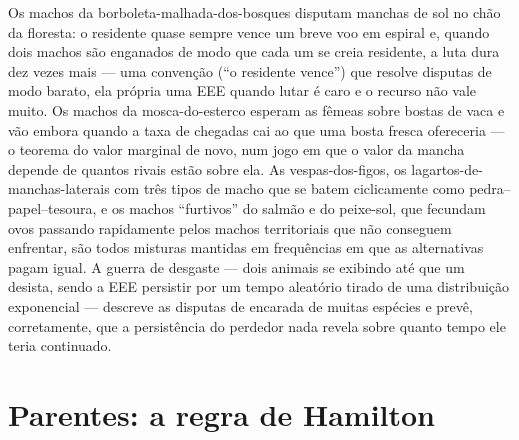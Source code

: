 \begin{example}\label{ex:b3:behavioural-ecology:games}
Os machos da borboleta-malhada-dos-bosques disputam manchas de sol no
chão da floresta: o residente quase sempre vence um breve voo em espiral
e, quando dois machos são enganados de modo que cada um se creia
residente, a luta dura dez vezes mais --- uma convenção (``o residente
vence'') que resolve disputas de modo barato, ela própria uma EEE quando
lutar é caro e o recurso não vale muito. Os machos da mosca-do-esterco
esperam as fêmeas sobre bostas de vaca e vão embora quando a taxa de
chegadas cai ao que uma bosta fresca ofereceria --- o teorema do valor
marginal de novo, num jogo em que o valor da mancha depende de quantos
rivais estão sobre ela. As vespas-dos-figos, os lagartos-de-manchas-laterais
com três tipos de macho que se batem ciclicamente como pedra--papel--tesoura,
e os machos ``furtivos'' do salmão e do peixe-sol, que fecundam ovos
passando rapidamente pelos machos territoriais que não conseguem
enfrentar, são todos misturas mantidas em frequências em que as
alternativas pagam igual. A guerra de desgaste --- dois animais se
exibindo até que um desista, sendo a EEE persistir por um tempo aleatório
tirado de uma distribuição exponencial --- descreve as disputas de
encarada de muitas espécies e prevê, corretamente, que a persistência do
perdedor nada revela sobre quanto tempo ele teria continuado.
\end{example}

\section{Parentes: a regra de Hamilton}

